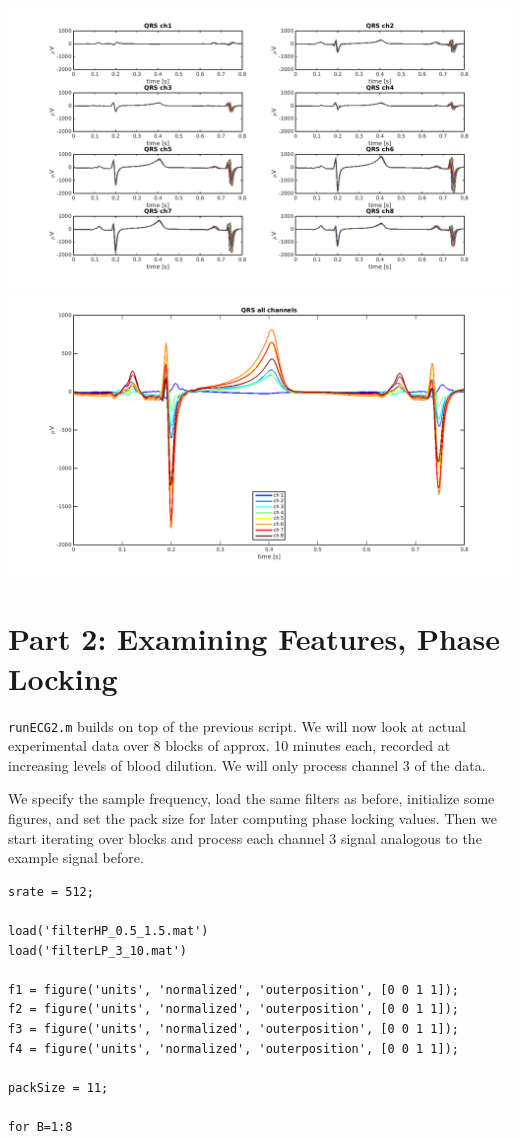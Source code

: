 \documentclass[10pt,a4paper,notitlepage]{report}
\begin{document}
\hspace{-1cm} \includegraphics[scale=0.25]{p2fig5.png}
\includegraphics[scale=0.25]{p2fig6.png}


\section*{Part 2: Examining Features, Phase Locking}
\texttt{runECG2.m} builds on top of the previous script. We will now look at actual experimental data over 8 blocks of approx. 10 minutes each, recorded at increasing levels of blood dilution. We will only process channel 3 of the data.

We specify the sample frequency, load the same filters as before, initialize some figures, and set the pack size for later computing phase locking values. Then we start iterating over blocks and process each channel 3 signal analogous to the example signal before.

\begin{verbatim}
srate = 512;

load('filterHP_0.5_1.5.mat')
load('filterLP_3_10.mat')

f1 = figure('units', 'normalized', 'outerposition', [0 0 1 1]);
f2 = figure('units', 'normalized', 'outerposition', [0 0 1 1]);
f3 = figure('units', 'normalized', 'outerposition', [0 0 1 1]);
f4 = figure('units', 'normalized', 'outerposition', [0 0 1 1]);

packSize = 11;

for B=1:8
\end{verbatim}
\end{document}
